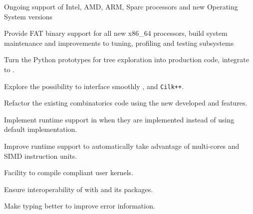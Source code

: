 \begin{workpackage}[id=hpc,wphases=0-48,
  title=High Performance Computing,
  PSRM=1, %
  LLRM=12, %
  SARM=18, %
  UKRM=1, %
  UBRM=1, %
  UJFRM=12]
\begin{wpdelivs}
\begin{wpdeliv}[due=24,id=MPIRprocessors,dissem=PU,nature=DEM]
      {Ongoing support of Intel, AMD, ARM, Sparc processors and new Operating System versions}
\end{wpdeliv}
  \begin{wpdeliv}[due=12,id=MPIRfat,dissem=PU,nature=DEM]
      {Provide FAT binary support for all new x86\_64 processors, build system maintenance and improvements to tuning, profiling and testing subsystems}
\end{wpdeliv}
  \begin{wpdeliv}[due=3,id=HPCcombi,dissem=PU,nature=DEM]
      {Turn the Python prototypes for tree exploration into    production code, integrate to \Sage.}
\end{wpdeliv}
  \begin{wpdeliv}[due=12,id=HPCcombi,dissem=PU,nature=DEM]
      {Explore the possibility to    interface smoothly \Pythran, \Cython and \texttt{Cilk++}.}
\end{wpdeliv}
  \begin{wpdeliv}[due=24,id=HPCcombi,dissem=PU,nature=DEM]
      {Refactor the existing combinatorics \Sage    code using the new developed  \Pythran and \Cython features.}
\end{wpdeliv}
  \begin{wpdeliv}[due=6,id=pythran-cython,dissem=PU,nature=DEM]
      {Implement \Pythran runtime support in \Cython when they are implemented instead of using default implementation.}
\end{wpdeliv}
  \begin{wpdeliv}[due=3,id=pythran-runtime,dissem=PU,nature=DEM]
      {Improve \Pythran runtime support to automatically take advantage of multi-cores and SIMD instruction units.}
\end{wpdeliv}
  \begin{wpdeliv}[due=2,id=pythran-sage,dissem=PU,nature=DEM]
      {Facility to compile \Pythran compliant user kernels.}
\end{wpdeliv}
  \begin{wpdeliv}[due=1,id=pythran,dissem=PU,nature=R]
      {Ensure interoperability of \Pythran with \Python and its packages.}
\end{wpdeliv}
  \begin{wpdeliv}[due=12,id=pythran-typing,dissem=PU,nature=DEM]
      {Make \Pythran typing better to improve error information.}
\end{wpdeliv}
\end{wpdelivs}
\end{workpackage}

